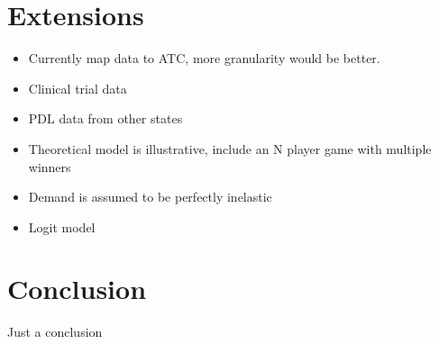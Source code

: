 \documentclass[12pt]{article}
\begin{document}
\section{Extensions}

\begin{itemize}
    \item Currently map data to ATC, more granularity would be better.
    \item Clinical trial data
    \item PDL data from other states
    \item Theoretical model is illustrative, include an N player game with multiple winners
    \item Demand is assumed to be perfectly inelastic
    \item Logit model
\end{itemize}

\section{Conclusion}

Just a conclusion
\end{document}
